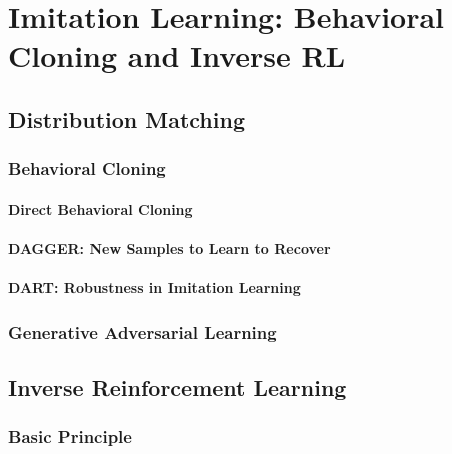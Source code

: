 \chapter{Imitation Learning: Behavioral Cloning and Inverse RL} %

	\section{Distribution Matching} %

		\subsection{Behavioral Cloning} %

			\subsubsection{Direct Behavioral Cloning} %

			\subsubsection{DAGGER: New Samples to Learn to Recover} %

			\subsubsection{DART: Robustness in Imitation Learning} %

		\subsection{Generative Adversarial Learning} %

	\section{Inverse Reinforcement Learning} %

		\subsection{Basic Principle} %

